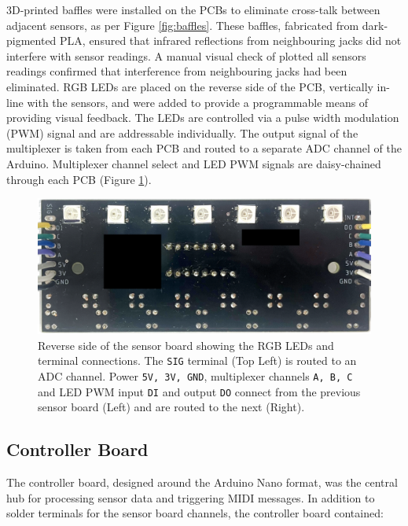 3D-printed baffles were installed on the PCBs to eliminate cross-talk between adjacent sensors, as per Figure \ref{fig:baffles}. These baffles, fabricated from dark-pigmented PLA, ensured that infrared reflections from neighbouring jacks did not interfere with sensor readings. A manual visual check of plotted all sensors readings confirmed that interference from neighbouring jacks had been eliminated. RGB LEDs are placed on the reverse side of the PCB, vertically in-line with the sensors, and were added to provide a programmable means of providing visual feedback. The LEDs are controlled via a pulse width modulation (PWM) signal and are addressable individually.
The output signal of the multiplexer is taken from each PCB and routed to a separate ADC channel of the Arduino. Multiplexer channel select and LED PWM signals are daisy-chained through each PCB (Figure \ref{fig:sensor-reverse}).

\begin{figure}[!b] 
  \centering
  \includegraphics[width=\linewidth]{src/images/sensor-board-reverse-side-anon.png} 
  \caption{Reverse side of the sensor board showing the RGB LEDs and terminal connections. The \texttt{SIG} terminal (Top Left) is routed to an ADC channel. Power \texttt{5V, 3V, GND}, multiplexer channels \texttt{A, B, C} and LED PWM input \texttt{DI} and output \texttt{DO}  connect from the previous sensor board (Left) and are routed to the next (Right).}
  \Description{} 
  \label{fig:sensor-reverse}
\end{figure}

\subsection{Controller Board}\label{controller-board}

The controller board, designed around the Arduino Nano format, was the central hub for processing sensor data and triggering MIDI messages. In addition to solder terminals for the sensor board channels, the controller board contained:

